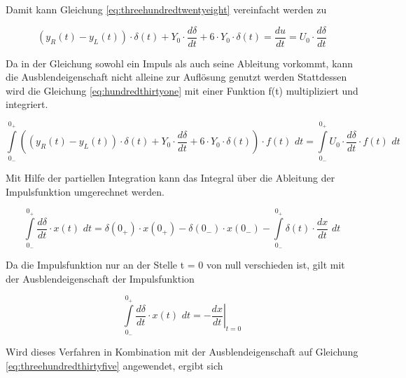 \noindent Damit kann Gleichung \eqref{eq:threehundredtwentyeight} vereinfacht werden zu

\begin{equation}\label{eq:hundredthirtyone}
\left(y_{R} \left(t\right)-y_{L} \left(t\right)\right)\cdot \delta \left(t\right)+Y_{0} \cdot \frac{d\delta }{dt} +6\cdot Y_{0} \cdot \delta \left(t\right)=\frac{du}{dt} =U_{0} \cdot \frac{d\delta }{dt}
\end{equation}

\noindent Da in der Gleichung sowohl ein Impuls als auch seine Ableitung vorkommt, kann die Ausblendeigenschaft nicht alleine zur Aufl\"{o}sung genutzt werden Stattdessen wird die Gleichung \eqref{eq:hundredthirtyone} mit einer Funktion f(t) multipliziert und integriert. 

\begin{equation}\label{eq:threehundredthirtytwo}
\int\limits _{0_{-} }^{0_{+} }\left(\left(y_{R} \left(t\right)-y_{L} \left(t\right)\right)\cdot \delta \left(t\right)+Y_{0} \cdot \frac{d\delta }{dt} +6\cdot Y_{0} \cdot \delta \left(t\right)\right)\cdot f\left(t\right)\, \, dt =\int\limits  _{0_{-} }^{0_{+} }U_{0} \cdot \frac{d\delta }{dt} \cdot f\left(t\right)\, \, dt 
\end{equation}

\noindent Mit Hilfe der partiellen Integration kann das Integral \"{u}ber die Ableitung der Impulsfunktion umgerechnet werden. 

\begin{equation}\label{eq:threehundredthirtythree}
\int\limits  _{0_{-} }^{0_{+} }\frac{d\delta }{dt} \cdot x\left(t\right)\, \, dt =\delta \left(0_{+} \right)\cdot x\left(0_{+} \right)-\delta \left(0_{-} \right)\cdot x\left(0_{-} \right)-\int\limits  _{0_{-} }^{0_{+} }\delta \left(t\right)\cdot \frac{dx}{dt} \, \, dt
\end{equation}

\noindent Da die Impulsfunktion nur an der Stelle t = 0 von null verschieden ist, gilt mit der Ausblendeigenschaft der Impulsfunktion

\begin{equation}\label{eq:threehundredthirtyfour}
\int\limits _{0_{-} }^{0_{+} }\frac{d\delta }{dt} \cdot x\left(t\right)\, \, dt =-\left. \frac{dx}{dt} \right|_{t=0}
\end{equation}

\noindent Wird dieses Verfahren in Kombination mit der Ausblendeigenschaft auf Gleichung \eqref{eq:threehundredthirtyfive} angewendet, ergibt sich

